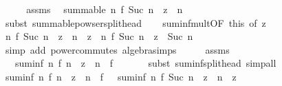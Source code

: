 \begin{isabellebody}
%
\isadelimproof
%
\endisadelimproof
%
\isatagproof
{}\isamarkupfalse%
\ {\isacharminus}{\kern0pt}\isanewline
\ \ \isamarkupfalse%
\ assms\ \isamarkupfalse%
\ {\isachardoublequoteopen}summable\ {\isacharparenleft}{\kern0pt}{\isasymlambda}n{\isachardot}{\kern0pt}\ f\ {\isacharparenleft}{\kern0pt}Suc\ n{\isacharparenright}{\kern0pt}\ {\isacharasterisk}{\kern0pt}\ z\ {\isacharcircum}{\kern0pt}\ n{\isacharparenright}{\kern0pt}{\isachardoublequoteclose}\isanewline
\ \ \ \ \isamarkupfalse%
\ {\isacharparenleft}{\kern0pt}subst\ summable{\isacharunderscore}{\kern0pt}powser{\isacharunderscore}{\kern0pt}split{\isacharunderscore}{\kern0pt}head{\isacharparenright}{\kern0pt}\isanewline
\ \ \isamarkupfalse%
\ suminf{\isacharunderscore}{\kern0pt}mult{}{\isacharbrackleft}{\kern0pt}OF\ this{\isacharcomma}{\kern0pt}\ of\ z{\isacharbrackright}{\kern0pt}\isanewline
\ \ \ \ \isamarkupfalse%
\ {\isachardoublequoteopen}{\isacharparenleft}{\kern0pt}{\isasymSum}n{\isachardot}{\kern0pt}\ f\ {\isacharparenleft}{\kern0pt}Suc\ n{\isacharparenright}{\kern0pt}\ {\isacharasterisk}{\kern0pt}\ z\ {\isacharcircum}{\kern0pt}\ n{\isacharparenright}{\kern0pt}\ {\isacharasterisk}{\kern0pt}\ z\ {\isacharequal}{\kern0pt}\ {\isacharparenleft}{\kern0pt}{\isasymSum}n{\isachardot}{\kern0pt}\ f\ {\isacharparenleft}{\kern0pt}Suc\ n{\isacharparenright}{\kern0pt}\ {\isacharasterisk}{\kern0pt}\ z\ {\isacharcircum}{\kern0pt}\ Suc\ n{\isacharparenright}{\kern0pt}{\isachardoublequoteclose}\isanewline
\ \ \ \ \isamarkupfalse%
\ {\isacharparenleft}{\kern0pt}simp\ add{\isacharcolon}{\kern0pt}\ power{\isacharunderscore}{\kern0pt}commutes\ algebra{\isacharunderscore}{\kern0pt}simps{\isacharparenright}{\kern0pt}\isanewline
\ \ \isamarkupfalse%
\ \isamarkupfalse%
\ assms\ \isamarkupfalse%
\ {\isachardoublequoteopen}{\isasymdots}\ {\isacharequal}{\kern0pt}\ suminf\ {\isacharparenleft}{\kern0pt}{\isasymlambda}n{\isachardot}{\kern0pt}\ f\ n\ {\isacharasterisk}{\kern0pt}\ z\ {\isacharcircum}{\kern0pt}\ n{\isacharparenright}{\kern0pt}\ {\isacharminus}{\kern0pt}\ f\ {}{\isachardoublequoteclose}\isanewline
\ \ \ \ \isamarkupfalse%
\ {\isacharparenleft}{\kern0pt}subst\ suminf{\isacharunderscore}{\kern0pt}split{\isacharunderscore}{\kern0pt}head{\isacharparenright}{\kern0pt}\ simp{\isacharunderscore}{\kern0pt}all\isanewline
\ \ \isamarkupfalse%
\ \isamarkupfalse%
\ {\isachardoublequoteopen}suminf\ {\isacharparenleft}{\kern0pt}{\isasymlambda}n{\isachardot}{\kern0pt}\ f\ n\ {\isacharasterisk}{\kern0pt}\ z\ {\isacharcircum}{\kern0pt}\ n{\isacharparenright}{\kern0pt}\ {\isacharequal}{\kern0pt}\ f\ {}\ {\isacharplus}{\kern0pt}\ suminf\ {\isacharparenleft}{\kern0pt}{\isasymlambda}n{\isachardot}{\kern0pt}\ f\ {\isacharparenleft}{\kern0pt}Suc\ n{\isacharparenright}{\kern0pt}\ {\isacharasterisk}{\kern0pt}\ z\ {\isacharcircum}{\kern0pt}\ n{\isacharparenright}{\kern0pt}\ {\isacharasterisk}{\kern0pt}\ z{\isachardoublequoteclose}\isanewline

\end{isabellebody}

